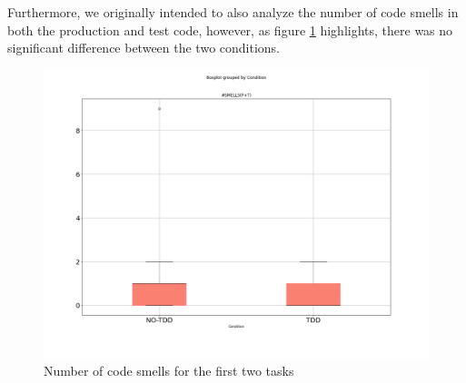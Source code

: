 Furthermore, we originally intended to also analyze the number of code smells in both the production and test code, however, as figure \ref{bp_task1_2_smells} highlights, there was no significant difference between the two conditions.

\begin{figure}[h]
    \centering
    \includegraphics[width=\linewidth]{figures/box_plots/SMELLS.png}
    \caption{Number of code smells for the first two tasks}
    \label{bp_task1_2_smells}
\end{figure}



